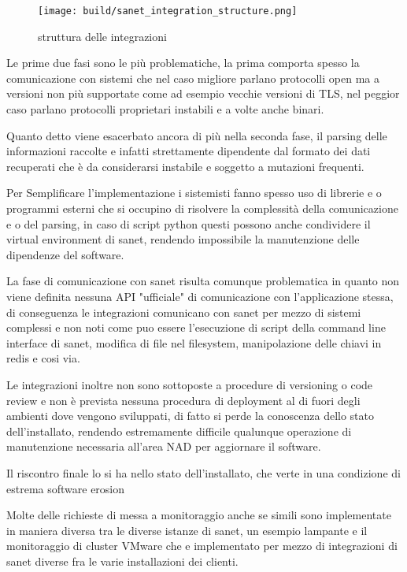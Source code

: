\begin{figure}[H]
    \centering
    \texttt{[image: build/sanet\_integration\_structure.png]}
    \caption{struttura delle integrazioni}
    \label{fig:enter-label}
\end{figure}

Le prime due fasi sono le più problematiche, la prima comporta spesso la comunicazione con sistemi che nel caso migliore parlano protocolli open ma a versioni non più supportate come ad esempio vecchie versioni di TLS, nel peggior caso parlano protocolli proprietari instabili e a volte anche binari.

Quanto detto viene esacerbato ancora di più nella seconda fase, il parsing delle informazioni raccolte e infatti strettamente dipendente dal formato dei dati recuperati che è da considerarsi instabile e soggetto a mutazioni frequenti.

Per Semplificare l'implementazione i sistemisti fanno spesso uso di librerie e o programmi esterni che si occupino di risolvere la complessità della comunicazione e o del parsing, in caso di script python questi possono anche condividere il virtual environment di sanet, rendendo impossibile la manutenzione delle dipendenze del software.

La fase di comunicazione con sanet risulta comunque problematica in quanto non viene definita nessuna API "ufficiale" di comunicazione con l'applicazione stessa, di conseguenza le integrazioni comunicano con sanet per mezzo di sistemi complessi e non noti come puo essere l'esecuzione di script della command line interface di sanet, modifica di file nel filesystem, manipolazione delle chiavi in redis e cosi via.

Le integrazioni inoltre non sono sottoposte a procedure di versioning o code review e non è prevista nessuna procedura di deployment al di fuori degli ambienti dove vengono sviluppati, di fatto si perde la conoscenza dello stato dell'installato, rendendo estremamente difficile qualunque operazione di manutenzione necessaria all'area NAD per aggiornare il software.

Il riscontro finale lo si ha nello stato dell'installato, che verte in una condizione di estrema software erosion

Molte delle richieste di messa a monitoraggio anche se simili sono implementate in maniera diversa tra le diverse istanze di sanet, un esempio lampante e il monitoraggio di cluster VMware che e implementato per mezzo di integrazioni di sanet diverse fra le varie installazioni dei clienti.

